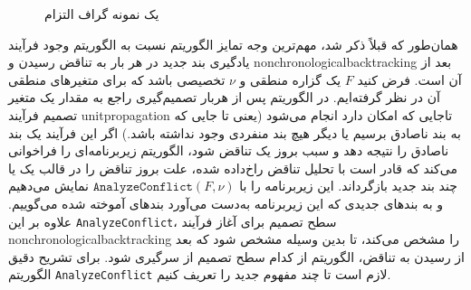\begin{figure}
	\centering
	
	\caption{یک نمونه گراف التزام}
	\label{fig:implication_graph_2}
\end{figure}

همان‌طور که قبلاً ذکر شد، مهم‌ترین وجه تمایز  الگوریتم 
نسبت به الگوریتم 
وجود فرآیند یادگیری بند جدید در هر بار به تناقض رسیدن  و 
\gls*{nonchronologicalbacktracking}
بعد از  آن است.  فرض کنید 
$F$
یک گزاره منطقی  و 
$\nu$
تخصیصی باشد که برای متغیرهای منطقی آن در نظر گرفته‌ایم.   در الگوریتم 
 پس از هربار تصمیم‌گیری راجع به مقدار یک متغیر تصمیم  فرآیند 
 \gls*{unitpropagation}
 تاجایی که امکان دارد انجام می‌شود (یعنی تا جایی که به بند ناصادق برسیم یا دیگر هیچ بند منفردی وجود نداشته باشد.) اگر این فرآیند یک بند ناصادق را نتیجه دهد و سبب بروز یک تناقض شود، الگوریتم 
 زیربرنامه‌ای  را فراخوانی می‌کند که قادر است  با تحلیل تناقض راخ‌داده شده، علت بروز تناقض را در قالب یک یا چند بند جدید بازگرداند.  این زیربرنامه  را با 
$ \texttt{AnalyzeConflict}(F, \nu)$
نمایش می‌دهیم و به بندهای جدیدی که این زیربرنامه به‌دست می‌آورد بندهای آموخته شده می‌گوییم. علاوه بر این 
\texttt{AnalyzeConflict}، 
سطح تصمیم برای  آغاز  فرآیند 
\gls*{nonchronologicalbacktracking}
را مشخص می‌کند، تا بدین وسیله مشخص شود که بعد از رسیدن به تناقض، الگوریتم از کدام سطح تصمیم   از سرگیری شود.  برای تشریح دقیق الگوریتم 
\texttt{AnalyzeConflict}
لازم است تا چند مفهوم جدید را تعریف کنیم. 

